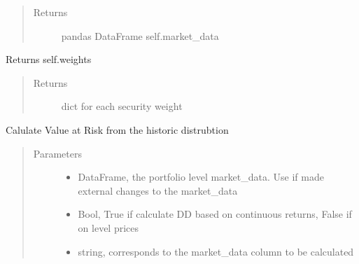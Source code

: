 \documentclass[letterpaper,10pt,english]{sphinxmanual}
\begin{document}
\begin{fulllineitems}
\begin{fulllineitems}
\begin{quote}
\begin{description}
\item[{Returns}] \leavevmode
pandas DataFrame self.market\_data

\end{description}\end{quote}

\end{fulllineitems}


\begin{fulllineitems}
\label{\detokenize{securities:risk_dash.securities.Portfolio.get_weights}}
Returns self.weights
\begin{quote}\begin{description}
\item[{Returns}] \leavevmode
dict for each security weight

\end{description}\end{quote}

\end{fulllineitems}


\begin{fulllineitems}
\label{\detokenize{securities:risk_dash.securities.Portfolio.historic_var}}
Calulate Value at Risk from the historic distrubtion
\begin{quote}\begin{description}
\item[{Parameters}] \leavevmode\begin{itemize}
\item {} 
 \textendash{} DataFrame, the portfolio level market\_data. Use if made external changes to the market\_data

\item {} 
 \textendash{} Bool, True if calculate DD based on continuous returns, False if on level prices

\item {} 
 \textendash{} string, corresponds to the market\_data column to be calculated


\end{itemize}
\end{description}
\end{quote}
\end{fulllineitems}
\end{fulllineitems}
\end{document}
